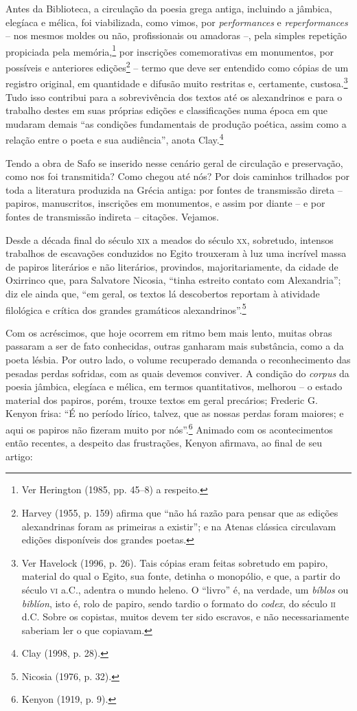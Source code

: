Antes da Biblioteca, a circulação da poesia grega antiga, incluindo a jâmbica,
elegíaca e mélica, foi viabilizada, como vimos, por \textit{performances} e
\textit{reperformances} -- nos mesmos moldes ou não, profissionais ou amadoras --, pela
simples repetição propiciada pela memória,\footnote{ Ver Herington (1985, pp.
45--8) a respeito.} por inscrições comemorativas em monumentos, por possíveis
e anteriores edições\footnote{ Harvey (1955, p. 159) afirma que “não há razão para pensar
que as edições alexandrinas foram as primeiras a existir”; e na Atenas clássica
circulavam edições disponíveis dos grandes poetas.} -- termo que deve ser
entendido como cópias de um registro original, em quantidade e difusão muito
restritas e, certamente, custosa.\footnote{ Ver Havelock (1996, p. 26). Tais
cópias eram feitas sobretudo em papiro, material do qual o Egito, sua fonte,
detinha o monopólio, e que, a partir do século \textsc{vi} a.C., adentra o mundo heleno.
O “livro” é, na verdade, um \textit{bíblos} ou \textit{biblíon}, isto é, rolo
de papiro, sendo tardio o formato do \textit{codex}, do século \textsc{ii} d.C. Sobre
os copistas, muitos devem ter sido escravos, e não necessariamente saberiam ler
o que copiavam.} Tudo isso contribui para a sobrevivência dos textos até os
alexandrinos e para o trabalho destes em suas próprias edições e classificações
numa época em que mudaram demais “as condições fundamentais de produção
poética, assim como a relação entre o poeta e sua audiência”, anota Clay.\footnote{ Clay (1998, p. 28).} 

Tendo a obra de Safo se inserido nesse cenário geral de circulação e
preservação, como nos foi transmitida? Como chegou até nós? Por dois caminhos
trilhados por toda a literatura produzida na Grécia antiga: por fontes de
transmissão direta -- papiros, manuscritos, inscrições em monumentos, e assim
por diante -- e por fontes de transmissão indireta -- citações. Vejamos. 

Desde a década final do século \textsc{xix} a meados do século \textsc{xx}, sobretudo,
intensos trabalhos de escavações conduzidos no Egito trouxeram à luz uma
incrível massa de papiros literários e não literários, provindos,
majoritariamente, da cidade de Oxirrinco que, para Salvatore Nicosia, “tinha
estreito contato com Alexandria”; diz ele ainda que, “em geral, os
textos lá descobertos reportam à atividade filológica e crítica dos grandes
gramáticos alexandrinos”.\footnote{ Nicosia (1976, p. 32).}

Com os acréscimos, que hoje ocorrem em ritmo bem mais lento,
muitas obras passaram a ser de fato conhecidas, outras ganharam mais
substância, como a da poeta lésbia. Por outro lado, o volume recuperado demanda
o reconhecimento das pesadas perdas sofridas, com as quais devemos conviver. A
condição do \textit{corpus} da poesia jâmbica, elegíaca e mélica, em termos
quantitativos, melhorou -- o estado material dos papiros, porém, trouxe textos
em geral precários; Frederic G. Kenyon frisa:
“É no período lírico, talvez, que as nossas perdas foram maiores; e aqui os
papiros não fizeram muito por nós”.\footnote{ Kenyon (1919, p. 9).} Animado com os acontecimentos então
recentes, a despeito das frustrações, Kenyon afirmava, ao final de seu
artigo: 

